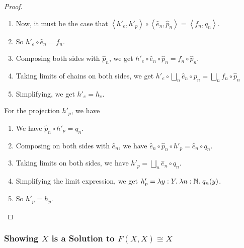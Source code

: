 \begin{proof}
\begin{enumerate}
\item Now, 
it must be the case that $\left<h'_e, h'_p\right> \circ \left<\hat{e}_n, \hat{p}_n\right> = 
\left<f_n, q_n\right>$. 

\item So $h'_e \circ \hat{e}_n = f_n$. 

\item Composing both sides with $\hat{p}_n$, we get 
   $h'_e \circ \hat{e}_n \circ \hat{p}_n = f_n \circ \hat{p}_n$. 

\item Taking limits of chains on both sides, we get $h'_e \circ \bigsqcup_n \hat{e}_n \circ{p}_n = \bigsqcup_n f_n \circ \hat{p}_n$

\item Simplifying, we get $h'_e = h_e$.
\end{enumerate}

For the projection $h'_p$, we have

\begin{enumerate}
\item We have $\hat{p}_n \circ h'_p = q_n$. 
\item Composing on both sides with $\hat{e}_n$, we have $\hat{e}_n \circ \hat{p}_n \circ h'_p = \hat{e}_n \circ q_n$. 
\item Taking limits on both sides, we have $h'_p = \bigsqcup_n \hat{e}_n \circ q_n$. 
\item Simplifying the limit expression, we get $h'_p = \lambda y:Y.\;\lambda n:\mathbb{N}.\; q_n(y)$. 
\item So $h'_p = h_p$. 
\end{enumerate}

\end{proof}


\subsubsection{Showing $X$ is a Solution to $F(X, X) \cong X$}


